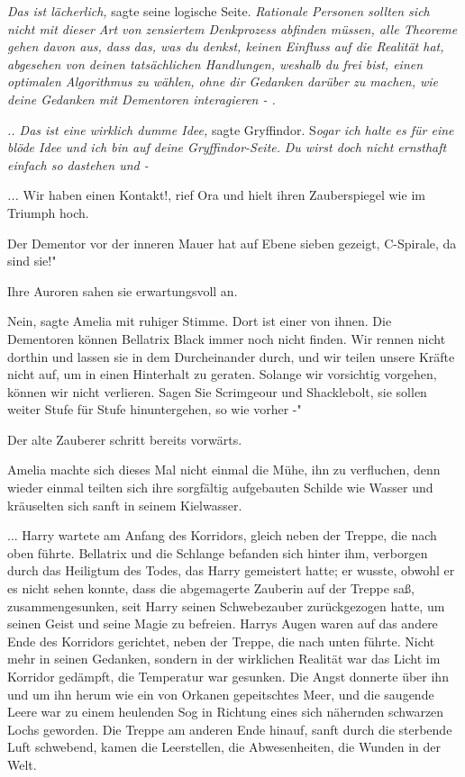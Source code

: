 \emph{Das ist lächerlich,} sagte seine logische Seite. \emph{Rationale Personen
sollten sich nicht mit dieser Art von zensiertem Denkprozess abfinden müssen,
alle Theoreme gehen davon aus, dass das, was du denkst, keinen Einfluss auf die
Realität hat, abgesehen von deinen tatsächlichen Handlungen, weshalb du frei
bist, einen optimalen Algorithmus zu wählen, ohne dir Gedanken darüber zu
machen, wie deine Gedanken mit Dementoren interagieren - .}

\emph{.. Das ist eine wirklich dumme Idee,} sagte Gryffindor. S\emph{ogar ich
halte es für eine} \emph{blöde Idee und ich bin auf deine Gryffindor-Seite.}
\emph{Du wirst doch nicht ernsthaft einfach so dastehen und -}

\emph{...}
\glqq{}Wir haben einen Kontakt!\grqq{}, rief Ora und hielt ihren Zauberspiegel
wie im Triumph hoch.

\glqq{}Der Dementor vor der inneren Mauer hat auf Ebene sieben gezeigt,
C-Spirale, da sind sie!"

Ihre Auroren sahen sie erwartungsvoll an.

\glqq{}Nein\grqq{}, sagte Amelia mit ruhiger Stimme. \glqq{}Dort ist einer von
ihnen. Die Dementoren können Bellatrix Black immer noch nicht finden. Wir rennen
nicht dorthin und lassen sie in dem Durcheinander durch, und wir teilen unsere
Kräfte nicht auf, um in einen Hinterhalt zu geraten. Solange wir vorsichtig
vorgehen, können wir nicht verlieren. Sagen Sie Scrimgeour und Shacklebolt, sie
sollen weiter Stufe für Stufe hinuntergehen, so wie vorher -"

Der alte Zauberer schritt bereits vorwärts.

Amelia machte sich dieses Mal nicht einmal die Mühe, ihn zu verfluchen, denn
wieder einmal teilten sich ihre sorgfältig aufgebauten Schilde wie Wasser und
kräuselten sich sanft in seinem Kielwasser.

... Harry wartete am Anfang des Korridors, gleich neben der Treppe, die nach
oben führte. Bellatrix und die Schlange befanden sich hinter ihm, verborgen
durch das Heiligtum des Todes, das Harry gemeistert hatte; er wusste, obwohl er
es nicht sehen konnte, dass die abgemagerte Zauberin auf der Treppe saß,
zusammengesunken, seit Harry seinen Schwebezauber zurückgezogen hatte, um seinen
Geist und seine Magie zu befreien. Harrys Augen waren auf das andere Ende des
Korridors gerichtet, neben der Treppe, die nach unten führte. Nicht mehr in
seinen Gedanken, sondern in der wirklichen Realität war das Licht im Korridor
gedämpft, die Temperatur war gesunken. Die Angst donnerte über ihn und um ihn
herum wie ein von Orkanen gepeitschtes Meer, und die saugende Leere war zu einem
heulenden Sog in Richtung eines sich nähernden schwarzen Lochs geworden. Die
Treppe am anderen Ende hinauf, sanft durch die sterbende Luft schwebend, kamen
die Leerstellen, die Abwesenheiten, die Wunden in der Welt.

